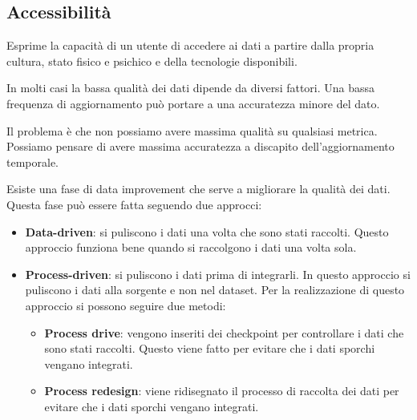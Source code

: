 \subsection{Accessibilità}
Esprime la capacità di un utente di accedere ai dati a partire dalla propria
cultura, stato fisico e psichico e della tecnologie disponibili.

In molti casi la bassa qualità dei dati dipende da diversi fattori. Una bassa
frequenza di aggiornamento può portare a una accuratezza minore del dato.

Il problema è che non possiamo avere massima qualità su qualsiasi metrica. Possiamo
pensare di avere massima accuratezza a discapito dell'aggiornamento temporale.

Esiste una fase di data improvement che serve a migliorare la qualità dei dati.
Questa fase può essere fatta seguendo due approcci:
\begin{itemize}
      \item \textbf{Data-driven}: si puliscono i dati una volta che sono stati
            raccolti. Questo approccio funziona bene quando si raccolgono i dati
            una volta sola.
      \item \textbf{Process-driven}: si puliscono i dati prima di integrarli.
            In questo approccio si puliscono i dati alla sorgente e non nel dataset.
            Per la realizzazione di questo approccio si possono seguire due metodi:
            \begin{itemize}
                  \item \textbf{Process drive}: vengono inseriti dei checkpoint
                        per controllare i dati che sono stati raccolti. Questo
                        viene fatto per evitare che i dati sporchi vengano integrati.
                  \item \textbf{Process redesign}: viene ridisegnato il processo
                        di raccolta dei dati per evitare che i dati sporchi vengano
                        integrati.
            \end{itemize}
\end{itemize}
